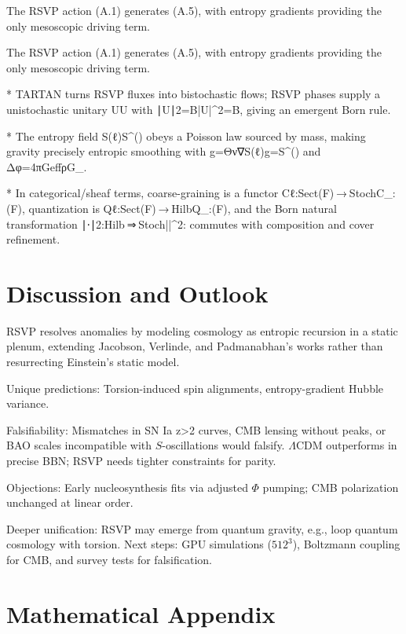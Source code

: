 \documentclass[11pt]{article}
\theoremstyle{plain}
\theoremstyle{definition}
\begin{document}
The RSVP action (A.1) generates (A.5), with entropy gradients providing the only mesoscopic driving term.

The RSVP action (A.1) generates (A.5), with entropy gradients providing the only mesoscopic driving term.

* TARTAN turns RSVP fluxes into bistochastic flows; RSVP phases supply a unistochastic unitary UU with ∣U∣2=B|U|^2=B, giving an emergent Born rule.

* The entropy field S(ℓ)S^{(\ell)} obeys a Poisson law sourced by mass, making gravity precisely entropic smoothing with g=Θν∇S(ℓ)\mathbf g=\frac{\Theta}{\nu}\nabla S^{(\ell)} and Δφ=4πGeffρ\Delta{}\pi G_\rho.

* In categorical/sheaf terms, coarse-graining is a functor Cℓ:Sect(F) ⁣→ ⁣Stoch\mathsf C_\ell:(\mathcal F)\!\to\!, quantization is Qℓ:Sect(F) ⁣→ ⁣Hilb\mathsf Q_\ell:(\mathcal F)\!\to\!, and the Born natural transformation ∣⋅∣2:Hilb ⁣⇒ ⁣Stoch|\cdot|^2:\!\Rightarrow\! commutes with composition and cover refinement.

\section{Discussion and Outlook}
RSVP resolves anomalies by modeling cosmology as entropic recursion in a static plenum, extending Jacobson, Verlinde, and Padmanabhan's works rather than resurrecting Einstein's static model.

Unique predictions: Torsion-induced spin alignments, entropy-gradient Hubble variance.

Falsifiability: Mismatches in SN Ia z>2 curves, CMB lensing without peaks, or BAO scales incompatible with $S$-oscillations would falsify. $\Lambda$CDM outperforms in precise BBN; RSVP needs tighter constraints for parity.

Objections: Early nucleosynthesis fits via adjusted $\Phi$ pumping; CMB polarization unchanged at linear order.

Deeper unification: RSVP may emerge from quantum gravity, e.g., loop quantum cosmology with torsion. Next steps: GPU simulations ($512^3$), Boltzmann coupling for CMB, and survey tests for falsification.

\appendix
\section{Mathematical Appendix}
\end{document}
